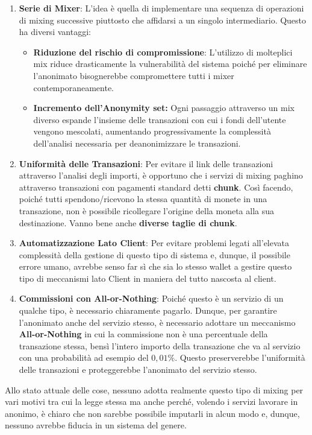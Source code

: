 \begin{enumerate}
    \item \textbf{Serie di Mixer}: L'idea è quella di implementare una sequenza di operazioni di mixing successive piuttosto che affidarsi a un singolo intermediario. Questo ha diversi vantaggi:
        \begin{itemize}
            \item \textbf{Riduzione del rischio di compromissione}: L'utilizzo di molteplici mix riduce drasticamente la vulnerabilità del sistema poiché per eliminare l'anonimato bisognerebbe compromettere tutti i mixer contemporaneamente. 
            \item \textbf{Incremento dell'Anonymity set:} Ogni passaggio attraverso un mix diverso espande l’insieme delle transazioni con cui i fondi dell’utente vengono mescolati, aumentando progressivamente la complessità dell’analisi necessaria per deanonimizzare le transazioni.
        \end{itemize}
    \item \textbf{Uniformità delle Transazioni}: Per evitare il link delle transazioni attraverso l'analisi degli importi, è opportuno che i servizi di mixing paghino attraverso transazioni con pagamenti standard detti \textbf{chunk}. Così facendo, poiché tutti spendono/ricevono la stessa quantità di monete in una transazione, non è possibile ricollegare l'origine della moneta alla sua destinazione. Vanno bene anche \textbf{diverse taglie di chunk}.
    \item \textbf{Automatizzazione Lato Client}: Per evitare problemi legati all'elevata complessità della gestione di questo tipo di sistema e, dunque, il possibile errore umano, avrebbe senso far sì che sia lo stesso wallet a gestire questo tipo di meccanismi lato Client in maniera del tutto nascosta al client.
    \item \textbf{Commissioni con All-or-Nothing}: Poiché questo è un servizio di un qualche tipo, è necessario chiaramente pagarlo. Dunque, per garantire l'anonimato anche del servizio stesso, è necessario adottare un meccanismo \textbf{All-or-Nothing} in cui la commissione non è una percentuale della transazione stessa, bensì l'intero importo della transazione che va al servizio con una probabilità ad esempio del $0,01\%$. Questo preserverebbe l'uniformità delle transazioni e proteggerebbe l'anonimato del servizio stesso.
\end{enumerate}
Allo stato attuale delle cose, nessuno adotta realmente questo tipo di mixing per vari motivi tra cui la legge stessa ma anche perché, volendo i servizi lavorare in anonimo, è chiaro che non sarebbe possibile imputarli in alcun modo e, dunque, nessuno avrebbe fiducia in un sistema del genere.

